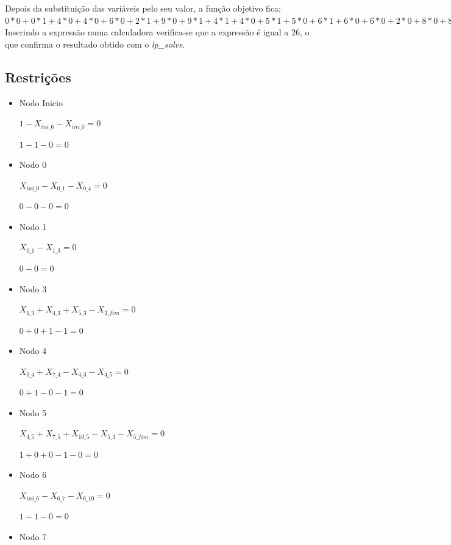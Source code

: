 Depois da substituição das variáveis pelo seu valor, a função objetivo
fica:\\[0.5cm]

$0*0+0*1+4*0+4*0+6*0+2*1+9*0+9*1+4*1+4*0+5*1
+5*0+6*1+6*0+6*0+2*0+8*0+8*0+8*0+7*0 = 26$\\[0.5cm]

Inserindo a expressão numa calculadora verifica-se que a expressão é igual a 26,
o que confirma o resultado obtido com o \textit{lp\_solve}.

\subsection{Restrições}

\begin{itemize}

\item Nodo Inicio 

$1-X_{ini\_6} - X_{ini\_0} = 0$

$1 - 1 - 0 = 0$

\item Nodo 0 

$X_{ini\_0}-X_{0\_1}-X_{0\_4} = 0$

$0 - 0 - 0 = 0$

\item Nodo 1 

$	X_{0\_1}-X_{1\_3} = 0$

$0 - 0 = 0$

\item Nodo 3 

$	X_{1\_3} + X_{4\_3} + X_{5\_3}-X_{3\_fim} = 0$

$0 + 0 + 1 - 1 = 0$

\item Nodo 4 

$	X_{0\_4} + X_{7\_4} - X_{4\_3} - X_{4\_5} = 0$

$0 + 1 - 0 - 1= 0$

\item Nodo 5 

$X_{4\_5} + X_{7\_5} + X_{10\_5} - X_{5\_3} - X_{5\_fim} = 0$

$1 + 0 + 0 - 1 - 0 = 0$

\item Nodo 6 

$X_{ini\_6} - X_{6\_7} - X_{6\_10} = 0$

$1 - 1 - 0 = 0$

\item Nodo 7 


\end{itemize}
